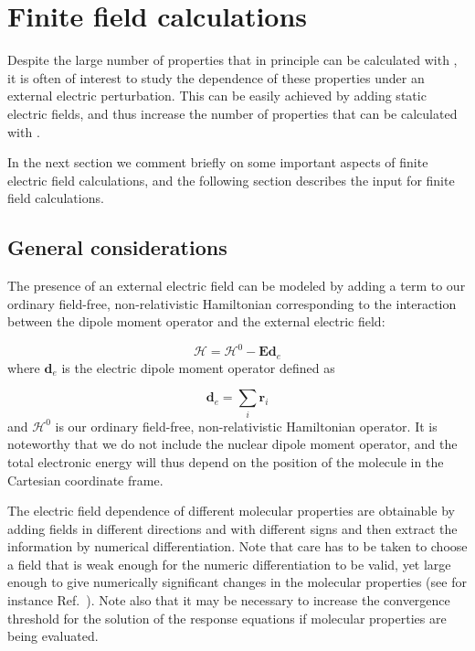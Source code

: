 \chapter{Finite field calculations}\label{ch:finite}

Despite the large number of properties that in principle can be
calculated with \dalton , it is often of interest to study the
dependence of these properties under an external electric
perturbation. This can be easily achieved by adding static electric
fields, and thus increase the number of properties
that can be calculated with \dalton .

In the next section we comment briefly on some important aspects of
finite electric field calculations, and the following section
describes the input for finite field calculations.

\section{General considerations}\label{sec:finitegeneral}

The presence of an external electric field can be modeled by adding a
term to our ordinary field-free, non-relativistic Hamiltonian
corresponding to the interaction between the dipole moment operator
and the external electric field:

\begin{equation}
\mathcal{H} = \mathcal{H}^{0} - \mathbf{Ed}_{e}
\end{equation}
where $\mathbf{d}_{e}$ is the electric dipole moment operator defined as 

\begin{equation}
\mathbf{d}_{e} = \sum_{i}\mathbf{r}_{i}
\end{equation}
and $\mathcal{H}^{0}$ is our ordinary field-free, non-relativistic
Hamiltonian operator. It is noteworthy that we do not include the
nuclear dipole moment operator, and the
total electronic energy will 
thus depend on the position of the molecule in the Cartesian
coordinate frame.

The electric field dependence of different molecular properties are
obtainable by adding fields in different directions and with different
signs and then extract the information by numerical
differentiation. Note that care has
to be taken to choose a field that 
is weak enough for the numeric differentiation to be valid,
yet large enough to give numerically significant changes in the
molecular properties (see for instance Ref.~\cite{mptskrarjcp121}). Note
also that it may be necessary to increase  
the convergence threshold for the solution of the response equations
if molecular properties are being evaluated.


